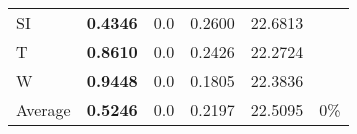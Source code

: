 \documentclass[11pt, a4paper]{article}
\begin{document}
\begin{table}[H]
\begin{tabular}{llllll}
SI                        & \textbf{0.4346}                   & 0.0                               & 0.2600                               & 22.6813                            &                          \\
T                              & \textbf{0.8610}                   & 0.0                               & 0.2426                               & 22.2724                            &                          \\
W                             & \textbf{0.9448}                   & 0.0                               & 0.1805                               & 22.3836                            &                          \\ \hline
Average                               & \textbf{0.5246}                   & 0.0                               & 0.2197                               & 22.5095                            & 0\%
\end{tabular}
\end{table}
\end{document}
